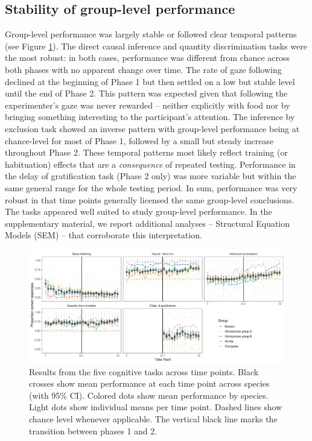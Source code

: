\documentclass[
  man,floatsintext]{apa6}
\begin{document}
\hypertarget{stability-of-group-level-performance}{%
\subsection{Stability of group-level performance}\label{stability-of-group-level-performance}}

Group-level performance was largely stable or followed clear temporal patterns (see Figure \ref{fig:perfplot}). The direct causal inference and quantity discrimination tasks were the most robust: in both cases, performance was different from chance across both phases with no apparent change over time. The rate of gaze following declined at the beginning of Phase 1 but then settled on a low but stable level until the end of Phase 2. This pattern was expected given that following the experimenter's gaze was never rewarded -- neither explicitly with food nor by bringing something interesting to the participant's attention. The inference by exclusion task showed an inverse pattern with group-level performance being at chance-level for most of Phase 1, followed by a small but steady increase throughout Phase 2. These temporal patterns most likely reflect training (or habituation) effects that are a \emph{consequence} of repeated testing. Performance in the delay of gratification task (Phase 2 only) was more variable but within the same general range for the whole testing period. In sum, performance was very robust in that time points generally licensed the same group-level conclusions. The tasks appeared well suited to study group-level performance. In the supplementary material, we report additional analyses -- Structural Equation Models (SEM) -- that corroborate this interpretation.

\begin{figure}
\includegraphics[width=1\linewidth]{./figures/performance} \caption{Results from the five cognitive tasks across time points. Black crosses show mean performance at each time point across species (with 95\% CI). Colored dots show mean performance by species. Light dots show individual means per time point. Dashed lines show chance level whenever applicable. The vertical black line marks the transition between phases 1 and 2.}\label{fig:perfplot}
\end{figure}
\end{document}
